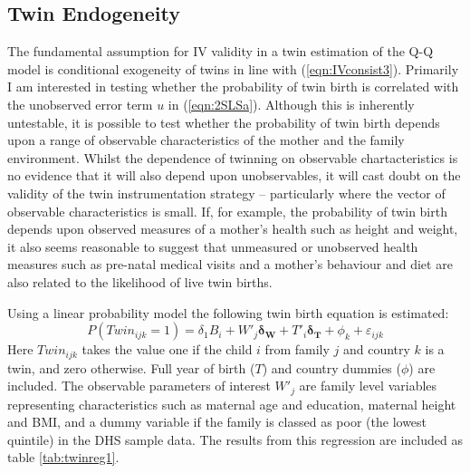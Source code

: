 \documentclass{article}[11pt,subeqn]
\newcommand{\vect}[1]{\mathbf{#1}}
\begin{document}
\begin{spacing}{1.5}
\subsection{Twin Endogeneity}
\label{scn:twinendog}
The fundamental assumption for IV validity in a twin estimation of the Q-Q model is conditional exogeneity of twins in line with (\ref{eqn:IVconsist3}).
Primarily I am interested in testing whether the probability of twin birth is correlated with the unobserved error term $u$ in (\ref{eqn:2SLSa}).  
Although this is inherently untestable, it is possible to test whether the probability of twin birth depends upon a range of observable characteristics 
of the mother and the family environment.  Whilst the dependence of twinning on observable chartacteristics is no evidence that it will also 
depend upon unobservables, it will cast doubt on the validity of the twin instrumentation strategy -- particularly where the vector of observable 
characteristics is small.  If, for example, the probability of twin birth depends upon observed measures of a mother's health such as height and weight, 
it also seems reasonable to suggest that unmeasured or unobserved health measures such as pre-natal medical visits and a mother's behaviour and diet
 are also related to the likelihood of live twin births. 
 
Using a linear probability model the following twin birth equation is estimated: 
\begin{equation}
\label{eqn:twinpred}
P(Twin_{ijk}=1)=\delta_1 B_i + W'_j\vect{\delta_\vect{W}}+ T'_{i}\vect{\delta_\vect{T}} +  \phi_k + \varepsilon_{ijk}
\end{equation}
Here $Twin_{ijk}$ takes the value one if the child $i$ from family $j$ and country $k$ is a twin, and zero otherwise.  Full year of birth ($T$) and country
dummies ($\phi$) are included.  The observable parameters of interest $W'_j$ are family level variables representing characteristics such as maternal age and
education, maternal height and BMI, and a dummy variable if the family is classed as poor (the lowest quintile) in the DHS sample data. The results from this 
regression are included as table \ref{tab:twinreg1}.


\end{spacing}
\end{document}

